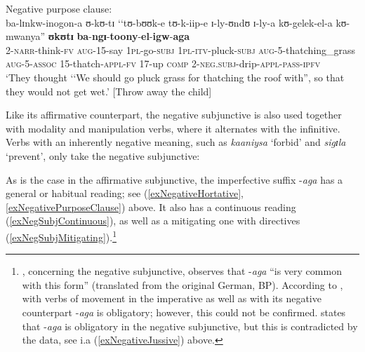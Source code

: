 \begin{exe}
\ex \label{exNegativePurposeClause}
Negative purpose clause:\\
\gll ba-lɪnkw-inogon-a ʊ-kʊ-tɪ \textup{\lq\lq}tʊ-bʊʊk-e tʊ-k-iip-e ɪ-ly-ʊndʊ ɪ-ly-a kʊ-gelek-el-a kʊ-mwanya\textup{''} \textbf{ʊkʊtɪ} \textbf{ba}-\textbf{ngɪ}-\textbf{toony}-\textbf{el}-\textbf{igw}-\textbf{aga}\\
2-\textsc{narr}-think-\textsc{fv} \textsc{aug}-15-say \phantom{\lq\lq}\textsc{1pl}-go-\textsc{subj} \textsc{1pl}-\textsc{itv}-pluck-\textsc{subj} \textsc{aug}-5-thatching\_grass \textsc{aug}-5-\textsc{assoc} 15-thatch-\textsc{appl}-\textsc{fv} 17-up \textsc{comp} 2-\textsc{neg.subj}-drip-\textsc{appl}-\textsc{pass}-\textsc{ipfv}\\
\glt \lq They thought \lq\lq We should go pluck grass for thatching the roof with'', so that they would not get wet.' [Throw away the child]
\end{exe}
Like its affirmative counterpart, the negative subjunctive is also used together with modality and manipulation verbs, where it alternates with the infinitive. Verbs with an inherently negative meaning, such as \textit{kaaniysa} \lq forbid' and \textit{sigɪla} \lq  prevent', only take the negative subjunctive:

\begin{exe}
\ex
\begin{xlist}
\end{xlist}
\end{exe}

\pagebreak
As is the case in the affirmative subjunctive, the imperfective suffix \mbox{-\textit{aga}} has a general or habitual reading; see (\ref{exNegativeHortative}, \ref{exNegativePurposeClause}) above. It also has a continuous reading (\ref{exNegSubjContinuous}), as well as a mitigating one with directives (\ref{exNegSubjMitigating}).\footnote{\citet[34]{SchumannK1899}, concerning the negative subjunctive, observes that -\textit{aga} ``is very common with this form'' (translated from the original German, BP). According to \citet{NurseD1979}, with verbs of movement in the imperative as well as with its negative counterpart -\textit{aga} is obligatory; however, this could not be confirmed. \citet{MwangokaNVoorhoeveJ1960b} states that -\textit{aga} is obligatory in the negative subjunctive, but this is contradicted by the data, see i.a (\ref{exNegativeJussive}) above.}

